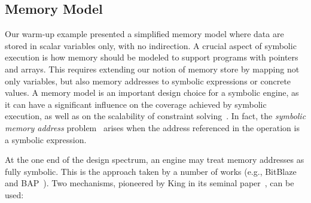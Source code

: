 
\subsection{Memory Model}
\label{ss:memory}


Our warm-up example presented a simplified memory model where data are stored in scalar variables only, with no indirection. A crucial aspect of symbolic execution is how memory should be modeled to support programs with pointers and arrays. This requires extending our notion of memory store by mapping not only variables, but also memory addresses to symbolic expressions or concrete values.
A memory model is an important design choice for a symbolic engine, as it can have a significant influence on the coverage achieved by symbolic execution, as well as on the scalability of constraint solving~\cite{CS-CACM13}. In fact, the {\em symbolic memory address} problem~\cite{SAB-SP10}  arises when the address referenced in the operation is a symbolic expression.

 At the one end of the design spectrum, an engine may treat memory addresses as fully symbolic. This is the approach taken by a number of works (e.g., {\sc BitBlaze}~\cite{BITBLAZE-ICISS08} and {\sc BAP}~\cite{BAP-CAV11}). Two mechanisms, pioneered by King in its seminal paper~\cite{K-CACM76}, can be used:


